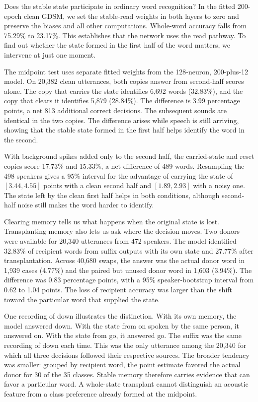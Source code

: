 \documentclass[10pt,twocolumn]{article}
\begin{document}
Does the stable state participate in ordinary word recognition? In the fitted 200-epoch clean GDSM, we set the stable-read weights in both layers to zero and preserve the biases and all other computations. Whole-word accuracy falls from 75.29\% to 23.17\%. This establishes that the network uses the read pathway. To find out whether the state formed in the first half of the word matters, we intervene at just one moment.

The midpoint test uses separate fitted weights from the 128-neuron, 200-plus-12 model. On 20,382 clean utterances, both copies answer from second-half scores alone. The copy that carries the state identifies 6,692 words (32.83\%), and the copy that clears it identifies 5,879 (28.84\%). The difference is 3.99 percentage points, a net 813 additional correct decisions. The subsequent sounds are identical in the two copies. The difference arises while speech is still arriving, showing that the stable state formed in the first half helps identify the word in the second.

With background spikes added only to the second half, the carried-state and reset copies score 17.73\% and 15.33\%, a net difference of 489 words. Resampling the 498 speakers gives a 95\% interval for the advantage of carrying the state of $[3.44,4.55]$ points with a clean second half and $[1.89,2.93]$ with a noisy one. The state left by the clean first half helps in both conditions, although second-half noise still makes the word harder to identify.

Clearing memory tells us what happens when the original state is lost. Transplanting memory also lets us ask where the decision moves. Two donors were available for 20,340 utterances from 472 speakers. The model identified 32.83\% of recipient words from suffix outputs with its own state and 27.77\% after transplantation. Across 40,680 swaps, the answer was the actual donor word in 1,939 cases (4.77\%) and the paired but unused donor word in 1,603 (3.94\%). The difference was 0.83 percentage points, with a 95\% speaker-bootstrap interval from 0.62 to 1.04 points. The loss of recipient accuracy was larger than the shift toward the particular word that supplied the state.

One recording of down illustrates the distinction. With its own memory, the model answered down. With the state from on spoken by the same person, it answered on. With the state from go, it answered go. The suffix was the same recording of down each time. This was the only utterance among the 20,340 for which all three decisions followed their respective sources. The broader tendency was smaller: grouped by recipient word, the point estimate favored the actual donor for 30 of the 35 classes. Stable memory therefore carries evidence that can favor a particular word. A whole-state transplant cannot distinguish an acoustic feature from a class preference already formed at the midpoint.
\end{document}
